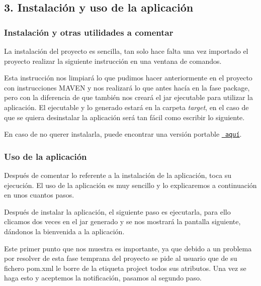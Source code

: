 \subsection*{3. Instalación y uso de la aplicación}

\subsubsection*{Instalación y otras utilidades a comentar}

La instalación del proyecto es sencilla, tan solo hace falta una vez importado el proyecto realizar la siguiente instrucción en una ventana de comandos. 
\begin{DoxyCode}{0}
\end{DoxyCode}
 Esta instrucción nos limpiará lo que pudimos hacer anteriormente en el proyecto con instrucciones M\+A\+V\+EN y nos realizará lo que antes hacía en la fase package, pero con la diferencia de que también nos creará el jar ejecutable para utilizar la aplicación. El ejecutable y lo generado estará en la carpeta {\itshape target}, en el caso de que se quiera desinstalar la aplicación será tan fácil como escribir lo siguiente. 
\begin{DoxyCode}{0}
\end{DoxyCode}
 En caso de no querer instalarla, puede encontrar una versión portable \href{https://github.com/cs-ehu/GAICurricula/releases/tag/1.0.1}{\texttt{ aquí}}. \subsubsection*{Uso de la aplicación}

Después de comentar lo referente a la instalación de la aplicación, toca su ejecución. El uso de la aplicación es muy sencillo y lo explicaremos a continuación en unos cuantos pasos.


\begin{DoxyEnumerate}
\item Después de instalar la aplicación, el siguiente paso es ejecutarla, para ello clicamos dos veces en el jar generado y se nos mostrará la pantalla siguiente, dándonos la bienvenida a la aplicación.
\end{DoxyEnumerate}



Este primer punto que nos muestra es importante, ya que debido a un problema por resolver de esta fase temprana del proyecto se pide al usuario que de su fichero pom.\+xml le borre de la etiqueta project todos sus atributos. Una vez se haga esto y aceptemos la notificación, pasamos al segundo paso.




